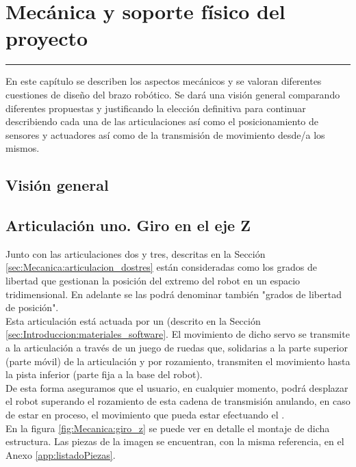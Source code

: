 \chapter{Mecánica y soporte físico del proyecto} \label{chap:Mecanica}
\hrule
\vspace{3mm}

En este capítulo se describen los aspectos mecánicos y se valoran diferentes cuestiones de diseño del brazo robótico. Se dará una visión general comparando diferentes propuestas y justificando la elección definitiva para continuar describiendo cada una de las articulaciones así como el posicionamiento de sensores y actuadores así como de la transmisión de movimiento desde/a los mismos.
 
\section{Visión general} \label{sec:Mecanica:vision_general}

\section{Articulación uno. Giro en el eje Z} \label{sec:Mecanica:articulacion_uno}
    Junto con las articulaciones dos y tres, descritas en la Sección \ref{sec:Mecanica:articulacion_dostres} están consideradas como los grados de libertad que gestionan la posición del extremo del robot en un espacio tridimensional. En adelante se las podrá denominar también "grados de libertad de posición".
    \\ 
    
    Esta articulación está actuada por un  (descrito en la Sección \ref{sec:Introduccion:materiales_software}. El movimiento de dicho servo se transmite a la articulación a través de un juego de ruedas que, solidarias a la parte superior (parte móvil) de la articulación y por rozamiento, transmiten el movimiento hasta la pista inferior (parte fija a la base del robot).
    \\ 
    
    De esta forma aseguramos que el usuario, en cualquier momento, podrá desplazar el robot superando el rozamiento de esta cadena de transmisión anulando, en caso de estar en proceso, el movimiento que pueda estar efectuando el .
	\\ 
	En la figura \ref{fig:Mecanica:giro_z} se puede ver en detalle el montaje de dicha estructura. Las piezas de la imagen se encuentran, con la misma referencia, en el Anexo \ref{app:listadoPiezas}.
	
